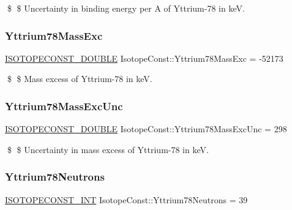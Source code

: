 \$ \$ Uncertainty in binding energy per A of Yttrium-\/78 in keV. \mbox{\label{group___isotope_const-_yttrium-_y78_gadadfdb67688e45b7f755390d6cf1dd97}} 
\subsubsection{\texorpdfstring{Yttrium78\+Mass\+Exc}{Yttrium78MassExc}}
{\footnotesize\ttfamily \mbox{\hyperlink{group___isotope_const-_macros_ga8f45a7272ce02c0b4c65c44636ed719a}{I\+S\+O\+T\+O\+P\+E\+C\+O\+N\+S\+T\+\_\+\+D\+O\+U\+B\+LE}} Isotope\+Const\+::\+Yttrium78\+Mass\+Exc = -\/52173}

\$ \$ Mass excess of Yttrium-\/78 in keV. \mbox{\label{group___isotope_const-_yttrium-_y78_ga1901e3be28987f5424855f2689c91c3b}} 
\subsubsection{\texorpdfstring{Yttrium78\+Mass\+Exc\+Unc}{Yttrium78MassExcUnc}}
{\footnotesize\ttfamily \mbox{\hyperlink{group___isotope_const-_macros_ga8f45a7272ce02c0b4c65c44636ed719a}{I\+S\+O\+T\+O\+P\+E\+C\+O\+N\+S\+T\+\_\+\+D\+O\+U\+B\+LE}} Isotope\+Const\+::\+Yttrium78\+Mass\+Exc\+Unc = 298}

\$ \$ Uncertainty in mass excess of Yttrium-\/78 in keV. \mbox{\label{group___isotope_const-_yttrium-_y78_ga23ee5aedcfdd2393b6d9cab9754754e6}} 
\subsubsection{\texorpdfstring{Yttrium78\+Neutrons}{Yttrium78Neutrons}}
{\footnotesize\ttfamily \mbox{\hyperlink{group___isotope_const-_macros_ga5f18360b3e99483a35c32d789e62621c}{I\+S\+O\+T\+O\+P\+E\+C\+O\+N\+S\+T\+\_\+\+I\+NT}} Isotope\+Const\+::\+Yttrium78\+Neutrons = 39}

